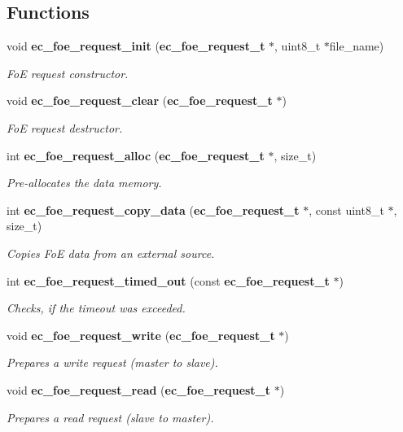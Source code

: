 \subsection*{Functions}
\begin{DoxyCompactItemize}
\item 
void {\bf ec\-\_\-foe\-\_\-request\-\_\-init} ({\bf ec\-\_\-foe\-\_\-request\-\_\-t} $\ast$, uint8\-\_\-t $\ast$file\-\_\-name)
\begin{DoxyCompactList}\small\item\em Fo\-E request constructor. \end{DoxyCompactList}\item 
void {\bf ec\-\_\-foe\-\_\-request\-\_\-clear} ({\bf ec\-\_\-foe\-\_\-request\-\_\-t} $\ast$)\label{foe__request_8h_a283c9080b0bde8595ed2d6833976013c}

\begin{DoxyCompactList}\small\item\em Fo\-E request destructor. \end{DoxyCompactList}\item 
int {\bf ec\-\_\-foe\-\_\-request\-\_\-alloc} ({\bf ec\-\_\-foe\-\_\-request\-\_\-t} $\ast$, size\-\_\-t)
\begin{DoxyCompactList}\small\item\em Pre-\/allocates the data memory. \end{DoxyCompactList}\item 
int {\bf ec\-\_\-foe\-\_\-request\-\_\-copy\-\_\-data} ({\bf ec\-\_\-foe\-\_\-request\-\_\-t} $\ast$, const uint8\-\_\-t $\ast$, size\-\_\-t)
\begin{DoxyCompactList}\small\item\em Copies Fo\-E data from an external source. \end{DoxyCompactList}\item 
int {\bf ec\-\_\-foe\-\_\-request\-\_\-timed\-\_\-out} (const {\bf ec\-\_\-foe\-\_\-request\-\_\-t} $\ast$)
\begin{DoxyCompactList}\small\item\em Checks, if the timeout was exceeded. \end{DoxyCompactList}\item 
void {\bf ec\-\_\-foe\-\_\-request\-\_\-write} ({\bf ec\-\_\-foe\-\_\-request\-\_\-t} $\ast$)\label{foe__request_8h_ad55e368490ade6fcb317302be6b4d684}

\begin{DoxyCompactList}\small\item\em Prepares a write request (master to slave). \end{DoxyCompactList}\item 
void {\bf ec\-\_\-foe\-\_\-request\-\_\-read} ({\bf ec\-\_\-foe\-\_\-request\-\_\-t} $\ast$)\label{foe__request_8h_a2ea1641840c50e93b9c1d22257677d9c}

\begin{DoxyCompactList}\small\item\em Prepares a read request (slave to master). \end{DoxyCompactList}\end{DoxyCompactItemize}


